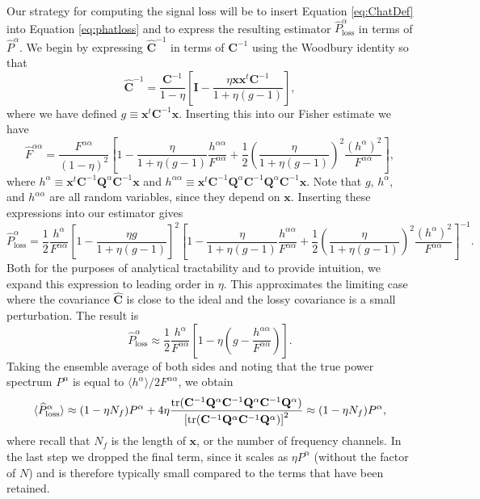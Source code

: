 \documentclass[12pt,preprint]{aastex}
\newcommand{\x}{\mathbf{x}}
\newcommand{\C}{\mathbf{C}}
\newcommand{\Chat}{\mathbf{\widehat{C}}}
\newcommand{\Q}{\mathbf{Q}}
\newcommand{\I}{\mathbf{I}}
\begin{document}
Our strategy for computing the signal loss will be to insert Equation \eqref{eq:ChatDef} into Equation \eqref{eq:phatloss} and to express the resulting estimator $\widehat{P}^\alpha_\textrm{loss}$ in terms of $\widehat{P}^\alpha$. We begin by expressing $\Chat^{-1}$ in terms of $\C^{-1}$ using the Woodbury identity so that
\begin{equation}
\Chat^{-1} = \frac{\C^{-1}}{1-\eta} \left[ \I - \frac{\eta \x \x^t \C^{-1}}{1+ \eta (g-1)}\right],
\end{equation}
where we have defined $g \equiv \x^t \C^{-1} \x$. Inserting this into our Fisher estimate we have
\begin{equation}
\widehat{F}^{\alpha \alpha} = \frac{F^{\alpha \alpha}}{(1-\eta)^2} \left[ 1 -\frac{\eta }{1+ \eta (g-1)} \frac{h^{\alpha \alpha}}{F^{\alpha \alpha}} + \frac{1}{2} \left( \frac{\eta }{1+ \eta (g-1)} \right)^2 \frac{(h^{\alpha})^2}{F^{\alpha \alpha}}\right],
\end{equation}
where $h^\alpha \equiv \x^t \C^{-1} \Q^\alpha \C^{-1} \x $ and $h^{\alpha \alpha} \equiv \x^t \C^{-1} \Q^\alpha \C^{-1} \Q^\alpha \C^{-1}\x $. Note that $g$, $h^\alpha$, and $h^{\alpha \alpha}$ are all random variables, since they depend on $\x$. Inserting these expressions into our estimator gives
\begin{equation}
\label{eq:phatlossexpanded}
\widehat{P}^\alpha_\textrm{loss} = \frac{1}{2} \frac{h^\alpha}{F^{\alpha \alpha}} \left[ 1 - \frac{\eta g}{1+ \eta (g-1)}\right]^2  \left[ 1 -\frac{\eta }{1+ \eta (g-1)} \frac{h^{\alpha \alpha}}{F^{\alpha \alpha}} + \frac{1}{2} \left( \frac{\eta }{1+ \eta (g-1)} \right)^2 \frac{(h^\alpha)^2}{F^{\alpha \alpha}}\right]^{-1}.
\end{equation}
Both for the purposes of analytical tractability and to provide intuition, we expand this expression to leading 
order in $\eta$. This approximates the limiting case where the covariance $\Chat$ is close to the ideal and the 
lossy covariance is a small perturbation.  The result is
\begin{equation}
\widehat{P}^\alpha_\textrm{loss} \approx \frac{1}{2} \frac{h^\alpha}{F^{\alpha \alpha}} \left[ 1 - \eta \left( g - \frac{h^{\alpha \alpha}}{F^{\alpha \alpha}}\right)\right].
\end{equation}
Taking the ensemble average of both sides and noting that the true power spectrum $P^\alpha$ is equal to $\langle h^\alpha \rangle / 2 F^{\alpha \alpha}$, we obtain
\begin{equation}
\langle \widehat{P}^\alpha_\textrm{loss} \rangle \approx (1- \eta N_f) P^\alpha + 4 \eta \frac{\rm{tr} (\C^{-1} \Q^\alpha \C^{-1} \Q^\alpha \C^{-1} \Q^\alpha )}{\left[ \rm{tr} (\C^{-1} \Q^\alpha \C^{-1} \Q^\alpha  ) \right]^2} \approx (1- \eta N_f) P^\alpha,
\end{equation}
where recall that $N_f$ is the length of $\x$, or the number of frequency channels. In the last step we dropped the final term, since it scales as $\eta P^\alpha$ (without the factor of $N$) and is therefore typically small compared to the terms that have been retained.
\end{document}
